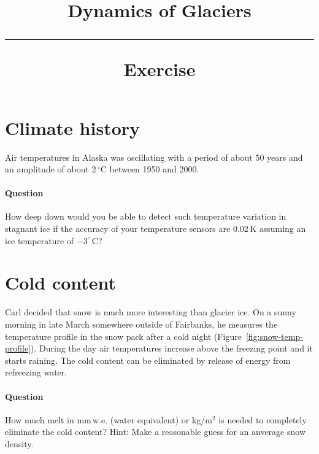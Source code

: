 \documentclass[parskip=half]{scrartcl}
\newcommand{\cels}[1]{\ensuremath{#1^{\circ}\,\mathrm{C}}}
\begin{document}
\vspace{-5em}

\title{Dynamics of Glaciers \\[.2em]
\rule[1em]{\textwidth}{2pt}
\LARGE\textsf{Exercise}
}
\date{}

\vspace{-5em}

\maketitle


\vspace{-5em}


\section{Climate history}

Air temperatures in Alaska was oscillating with a period of about 50 years and an amplitude of about 2$\,^\circ\text{C}$ between 1950 and 2000. 

\paragraph{Question} How deep down would you be able to detect such temperature variation in stagnant ice if the accuracy of your temperature sensors are 0.02$\,\text{K}$ assuming an ice temperature of $-\cels{3}$?

\section{Cold content}

Carl decided that snow is much more interesting than glacier ice. On a sunny morning in late March somewhere outside of Fairbanks, he measures the temperature profile in the snow pack after a cold night (Figure~\ref{fig:snow-temp-profile}). During the day air temperatures increase above the freezing point and it starts raining. The cold content can be eliminated by release of energy from refreezing water. 

\paragraph{Question} How much melt in mm\,w.e. (water equivalent) or kg/m$^{2}$ is needed to completely eliminate the cold content? Hint: Make a reasonable guess for an anverage snow density.
\end{document}
